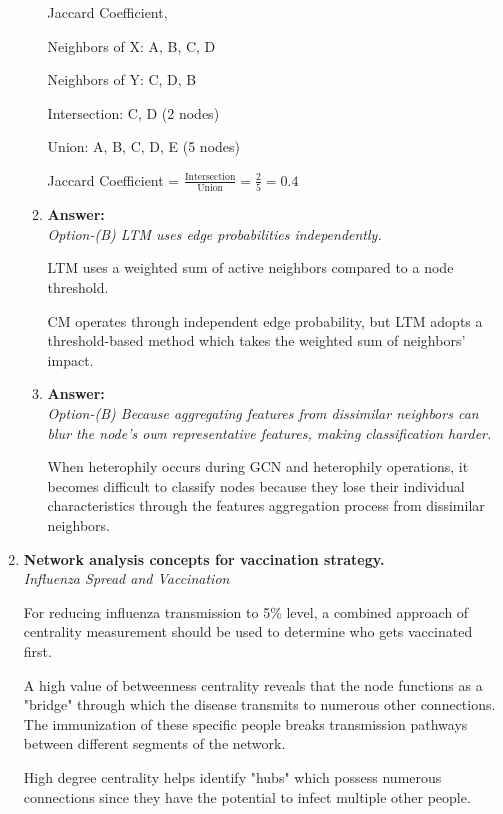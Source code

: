 \documentclass[a4paper,12pt]{article}
\begin{document}
\begin{enumerate}[label=\textbf{Q\arabic*.}]
\begin{enumerate}[label=(\alph*)]
        Jaccard Coefficient,

        Neighbors of X: A, B, C, D

        Neighbors of Y: C, D, B

        Intersection: C, D (2 nodes)

        Union: A, B, C, D, E (5 nodes)

        Jaccard Coefficient = \(\frac{\text{Intersection}}{\text{Union}} = \frac{2}{5} = 0.4\)
        
        \item \textbf{Answer:} \\
        \textit{Option-(B) LTM uses edge probabilities independently.}

        LTM uses a weighted sum of active neighbors compared to a node threshold.

        CM operates through independent edge probability, but LTM adopts a threshold-based method which takes the weighted sum of neighbors' impact.
        
        \item \textbf{Answer:} \\
        \textit{Option-(B) Because aggregating features from dissimilar neighbors can blur the node's own representative features, making classification harder.}

        When heterophily occurs during GCN and heterophily operations, it becomes difficult to classify nodes because they lose their individual characteristics through the features aggregation process from dissimilar neighbors.
    \end{enumerate}
    
    \item \textbf{Network analysis concepts for vaccination strategy.} \\
    \textit{Influenza Spread and Vaccination}

    For reducing influenza transmission to 5\% level, a combined approach of centrality measurement should be used to determine who gets vaccinated first.

    A high value of betweenness centrality reveals that the node functions as a "bridge" through which the disease transmits to numerous other connections. The immunization of these specific people breaks transmission pathways between different segments of the network.

    High degree centrality helps identify "hubs" which possess numerous connections since they have the potential to infect multiple other people.


\end{enumerate}
\end{document}
